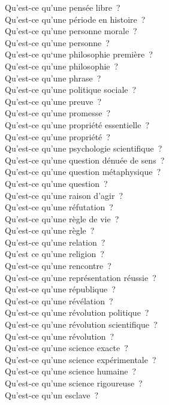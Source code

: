 \documentclass[a4paper,12pt]{article}
\begin{document}
Qu'est-ce qu'une pensée libre ? \\
Qu'est-ce qu'une période en histoire ? \\
Qu'est-ce qu'une personne morale ? \\
Qu'est-ce qu'une personne ? \\
Qu'est-ce qu‘une philosophie première ? \\
Qu'est-ce qu'une philosophie ? \\
Qu'est-ce qu'une phrase ? \\
Qu'est-ce qu'une politique sociale ? \\
Qu'est-ce qu'une preuve ? \\
Qu'est-ce qu'une promesse ? \\
Qu'est-ce qu'une propriété essentielle ? \\
Qu'est-ce qu'une propriété ? \\
Qu'est-ce qu'une psychologie scientifique ? \\
Qu'est-ce qu'une question dénuée de sens ? \\
Qu'est-ce qu'une question métaphysique ? \\
Qu'est-ce qu'une question ? \\
Qu'est-ce qu'une raison d'agir ? \\
Qu'est-ce qu'une réfutation ? \\
Qu'est-ce qu'une règle de vie ? \\
Qu'est-ce qu'une règle ? \\
Qu'est-ce qu'une relation ? \\
Qu'est ce qu'une religion ? \\
Qu'est-ce qu'une rencontre ? \\
Qu'est-ce qu'une représentation réussie ? \\
Qu'est-ce qu'une république ? \\
Qu'est-ce qu'une révélation ? \\
Qu'est-ce qu'une révolution politique ? \\
Qu'est-ce qu'une révolution scientifique ? \\
Qu'est-ce qu'une révolution ? \\
Qu'est-ce qu'une science exacte ? \\
Qu'est-ce qu'une science expérimentale ? \\
Qu'est-ce qu'une science humaine ? \\
Qu'est-ce qu'une science rigoureuse ? \\
Qu'est-ce qu'un esclave ? \\
\end{document}
